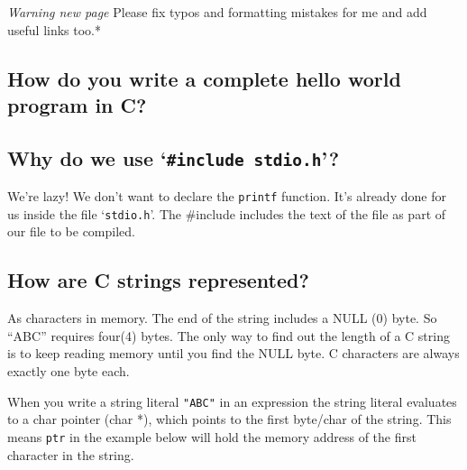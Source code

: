 \emph{Warning new page} Please fix typos and formatting mistakes for me
and add useful links too.*

\subsection{How do you write a complete hello world program in
C?}\label{how-do-you-write-a-complete-hello-world-program-in-c}

\begin{Shaded}
\begin{Highlighting}[]
 
    \NormalTok{);}
     \NormalTok{; }
\NormalTok{\}}
\end{Highlighting}
\end{Shaded}

\subsection{\texorpdfstring{Why do we use
`\texttt{\#include\ stdio.h}'?}{Why do we use \#include stdio.h?}}\label{why-do-we-use-include-stdio.h}

We're lazy! We don't want to declare the \texttt{printf} function. It's
already done for us inside the file `\texttt{stdio.h}'. The \#include
includes the text of the file as part of our file to be compiled.

\subsection{How are C strings
represented?}\label{how-are-c-strings-represented}

As characters in memory. The end of the string includes a NULL (0) byte.
So ``ABC'' requires four(4) bytes. The only way to find out the length
of a C string is to keep reading memory until you find the NULL byte. C
characters are always exactly one byte each.

When you write a string literal \texttt{"ABC"} in an expression the
string literal evaluates to a char pointer (char *), which points to the
first byte/char of the string. This means \texttt{ptr} in the example
below will hold the memory address of the first character in the string.

\begin{Shaded}
\begin{Highlighting}[]
 
\end{Highlighting}
\end{Shaded}

